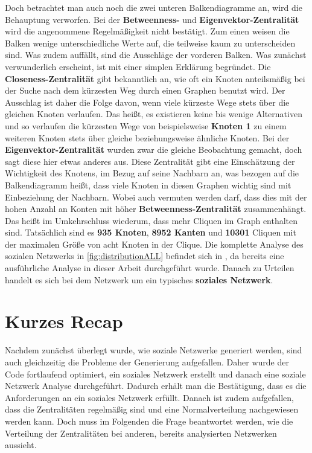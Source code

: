 Doch betrachtet man auch noch die zwei unteren Balkendiagramme an, wird die Behauptung verworfen. Bei der \textbf{Betweenness-} und \textbf{Eigenvektor-Zentralität} wird die angenommene Regelmäßigkeit nicht bestätigt. Zum einen weisen die Balken wenige unterschiedliche Werte auf, die teilweise kaum zu unterscheiden sind. Was zudem auffällt, sind die Ausschläge der vorderen Balken. Was zunächst verwunderlich erscheint, ist mit einer simplen Erklärung begründet. Die \textbf{Closeness-Zentralität} gibt bekanntlich an, wie oft ein Knoten anteilsmäßig bei der Suche nach dem kürzesten Weg durch einen Graphen benutzt wird. Der Ausschlag ist daher die Folge davon, wenn viele kürzeste Wege stets über die gleichen Knoten verlaufen. Das heißt, es existieren keine bis wenige Alternativen und so verlaufen die kürzesten Wege von beispielsweise \textbf{Knoten 1} zu einem weiteren Knoten stets über gleiche beziehungsweise ähnliche Knoten. Bei der \textbf{Eigenvektor-Zentralität} wurden zwar die gleiche Beobachtung gemacht, doch sagt diese hier etwas anderes aus. Diese Zentralität gibt eine Einschätzung der Wichtigkeit des Knotens, im Bezug auf seine Nachbarn an, was bezogen auf die Balkendiagramm heißt, dass viele Knoten in diesen Graphen wichtig sind mit Einbeziehung der Nachbarn. Wobei auch vermuten werden darf, dass dies mit der hohen Anzahl an Konten mit höher \textbf{Betweenness-Zentralität} zusammenhängt. Das heißt im Umkehrschluss wiederum, dass mehr Cliquen im Graph enthalten sind. Tatsächlich sind es \textbf{935 Knoten}, \textbf{8952 Kanten} und \textbf{10301} Cliquen mit der maximalen Größe von acht Knoten in der Clique.
Die komplette Analyse des sozialen Netzwerks in \ref{fig:distributionALL} befindet sich in \cite{TZ}, da bereits eine ausführliche Analyse in dieser Arbeit durchgeführt wurde. Danach zu Urteilen handelt es sich bei dem Netzwerk um ein typisches \textbf{soziales Netzwerk}.

\section{Kurzes Recap}
Nachdem zunächst überlegt wurde, wie soziale Netzwerke generiert werden, sind auch gleichzeitig die Probleme der Generierung aufgefallen. Daher wurde der Code fortlaufend optimiert, ein soziales Netzwerk erstellt und danach eine soziale Netzwerk Analyse durchgeführt. Dadurch erhält man die Bestätigung, dass es die Anforderungen an ein soziales Netzwerk erfüllt. Danach ist zudem aufgefallen, dass die Zentralitäten regelmäßig sind und eine Normalverteilung nachgewiesen werden kann. Doch muss im Folgenden die Frage beantwortet werden, wie die Verteilung der Zentralitäten bei anderen, bereits analysierten Netzwerken aussieht.
